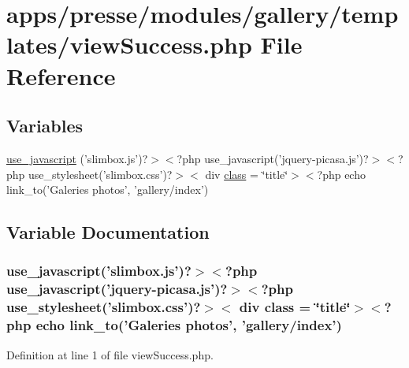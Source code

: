 \hypertarget{presse_2modules_2gallery_2templates_2view_success_8php}{\section{apps/presse/modules/gallery/templates/view\-Success.php File Reference}
\label{presse_2modules_2gallery_2templates_2view_success_8php}
}
\subsection*{Variables}
\begin{DoxyCompactItemize}
\item 
\hyperlink{presse_2modules_2gallery_2templates_2view_success_8php_ad2054e45909dec3e520fafaee7c716af}{use\-\_\-javascript} ('slimbox.\-js')?$>$$<$?php use\-\_\-javascript('jquery-\/picasa.\-js')?$>$$<$?php use\-\_\-stylesheet('slimbox.\-css')?$>$$<$ div \hyperlink{live_2modules_2news_2templates_2__actualitelight_8php_a185c73c6507391d1eb38c776b68ce96d}{class} = \char`\"{}title\char`\"{}$>$$<$?php echo link\-\_\-to('Galeries photos', 'gallery/index')
\end{DoxyCompactItemize}


\subsection{Variable Documentation}
\hypertarget{presse_2modules_2gallery_2templates_2view_success_8php_ad2054e45909dec3e520fafaee7c716af}{
\subsubsection[{use\-\_\-javascript}]{\setlength{\rightskip}{0pt plus 5cm}use\-\_\-javascript('slimbox.\-js')?$>$$<$?php use\-\_\-javascript('jquery-\/picasa.\-js')?$>$$<$?php use\-\_\-stylesheet('slimbox.\-css')?$>$$<$ div {\bf class} = \char`\"{}title\char`\"{}$>$$<$?php echo link\-\_\-to('Galeries photos', 'gallery/index')}}\label{presse_2modules_2gallery_2templates_2view_success_8php_ad2054e45909dec3e520fafaee7c716af}


Definition at line 1 of file view\-Success.\-php.

